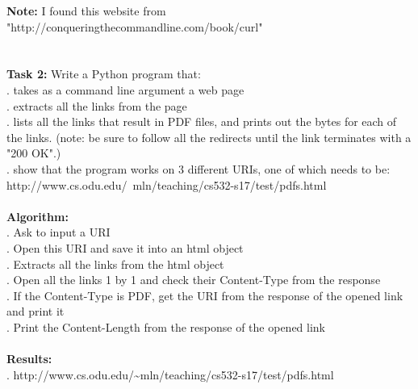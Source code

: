 \documentclass{article}
\begin{document}
		\textbf{Note:} I found this website from "http://conqueringthecommandline.com/book/curl"\\\\\\
		\textbf{Task 2:} Write a Python program that:\\
		. takes as a command line argument a web page\\
		. extracts all the links from the page\\
		. lists all the links that result in PDF files, and prints out the bytes for each of the links.  (note: be sure to follow all the redirects until the link terminates with a "200 OK".)\\
		. show that the program works on 3 different URIs, one of which needs to be:\\
		\indent http://www.cs.odu.edu/~mln/teaching/cs532-s17/test/pdfs.html\\\\
		\textbf{Algorithm:}\\
		. Ask to input a URI\\
		. Open this URI and save it into an html object\\
		. Extracts all the links from the html object\\
		. Open all the links 1 by 1 and check their Content-Type from the response\\
		. If the Content-Type is PDF, get the URI from the response of the opened link and print it\\
		. Print the Content-Length from the response of the opened link\\\\
		\textbf{Results:}\\
		. http://www.cs.odu.edu/\~{}mln/teaching/cs532-s17/test/pdfs.html\\
		\\\\
\end{document}
